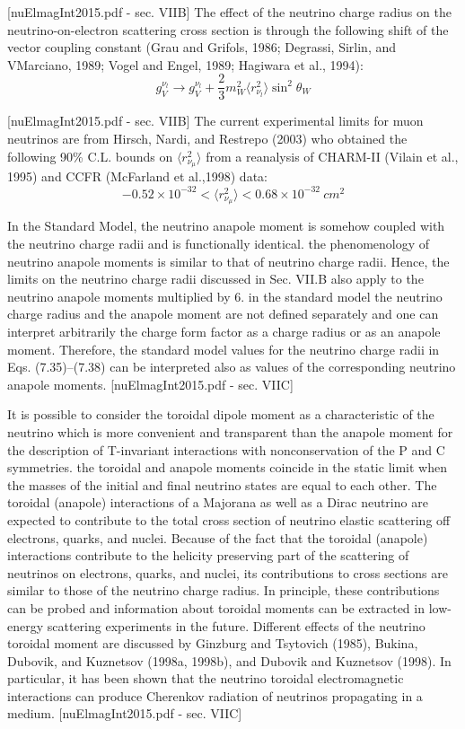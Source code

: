 [nuElmagInt2015.pdf - sec. VIIB]
The effect of the neutrino charge radius on the neutrino-on-electron scattering cross section is through the following shift of the vector coupling constant (Grau and Grifols, 1986; Degrassi, Sirlin, and VMarciano, 1989; Vogel and Engel, 1989; Hagiwara et al., 1994):
\begin{equation}
g_V^{\nu_l}\rightarrow g_V^{\nu_l}+\frac{2}{3}m_W^2\langle r_{\nu_l}^2\rangle\sin^2\theta_W
\end{equation}

[nuElmagInt2015.pdf - sec. VIIB]
The current experimental limits for muon neutrinos are from   Hirsch, Nardi, and Restrepo (2003) who obtained the
following 90\% C.L. bounds on $\langle r_{\nu_\mu}^2\rangle$ from a reanalysis of
CHARM-II (Vilain et al., 1995) and CCFR (McFarland et al.,1998) data:
\begin{equation}
-0.52\times 10^{-32}<\langle r_{\nu_\mu}^2\rangle<0.68\times 10^{-32}\ \unit{cm^2}
\end{equation}

In the Standard Model, the neutrino anapole moment is somehow coupled with the neutrino charge radii and is functionally identical. the phenomenology of neutrino anapole moments is similar to that of neutrino charge radii. Hence, the limits on the neutrino charge radii discussed in Sec. VII.B also apply to the neutrino anapole moments multiplied by 6.  in the standard model the neutrino charge radius and the anapole moment are not defined separately and one can interpret arbitrarily the charge form factor as a charge radius or as an anapole moment. Therefore, the standard model values for the neutrino charge radii in Eqs. (7.35)–(7.38) can be interpreted also as values of the corresponding neutrino anapole moments. [nuElmagInt2015.pdf - sec. VIIC]

It is possible to consider  the toroidal dipole moment as a characteristic of the neutrino which is more convenient and transparent than the anapole moment for the description of T-invariant interactions with nonconservation of the P and C symmetries. the toroidal and anapole moments coincide in the static limit when the masses of the initial and final neutrino states are equal to each other. The toroidal (anapole) interactions of a Majorana as well as a Dirac neutrino are expected to contribute to the total cross section of neutrino elastic scattering off electrons, quarks, and nuclei. Because of the fact that the toroidal (anapole) interactions contribute to the helicity preserving part of the scattering of neutrinos on electrons, quarks, and nuclei, its contributions to cross sections are similar to those of the neutrino charge radius. In principle, these contributions can be probed and information about toroidal moments can be extracted in low-energy scattering experiments in the future. Different effects of the neutrino toroidal moment are discussed by Ginzburg and Tsytovich (1985), Bukina, Dubovik, and Kuznetsov (1998a, 1998b), and Dubovik and Kuznetsov (1998). In particular, it has been shown that the neutrino toroidal electromagnetic interactions can produce Cherenkov radiation of neutrinos propagating in a medium. [nuElmagInt2015.pdf - sec. VIIC]

